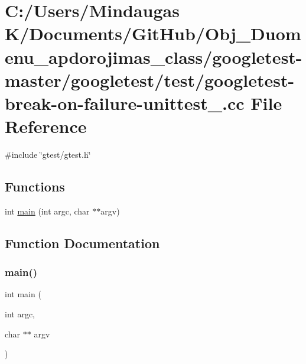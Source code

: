 \hypertarget{googletest-master_2googletest_2test_2googletest-break-on-failure-unittest___8cc}{}\section{C\+:/\+Users/\+Mindaugas K/\+Documents/\+Git\+Hub/\+Obj\+\_\+\+Duomenu\+\_\+apdorojimas\+\_\+class/googletest-\/master/googletest/test/googletest-\/break-\/on-\/failure-\/unittest\+\_\+.cc File Reference}
\label{googletest-master_2googletest_2test_2googletest-break-on-failure-unittest___8cc}
{\ttfamily \#include \char`\"{}gtest/gtest.\+h\char`\"{}}\newline
\subsection*{Functions}
\begin{DoxyCompactItemize}
\item 
int \mbox{\hyperlink{googletest-master_2googletest_2test_2googletest-break-on-failure-unittest___8cc_a3c04138a5bfe5d72780bb7e82a18e627}{main}} (int argc, char $\ast$$\ast$argv)
\end{DoxyCompactItemize}


\subsection{Function Documentation}
\mbox{\label{googletest-master_2googletest_2test_2googletest-break-on-failure-unittest___8cc_a3c04138a5bfe5d72780bb7e82a18e627}} 
\subsubsection{\texorpdfstring{main()}{main()}}
{\footnotesize\ttfamily int main (\begin{DoxyParamCaption}\item[{int}]{argc,  }\item[{char $\ast$$\ast$}]{argv }\end{DoxyParamCaption})}

